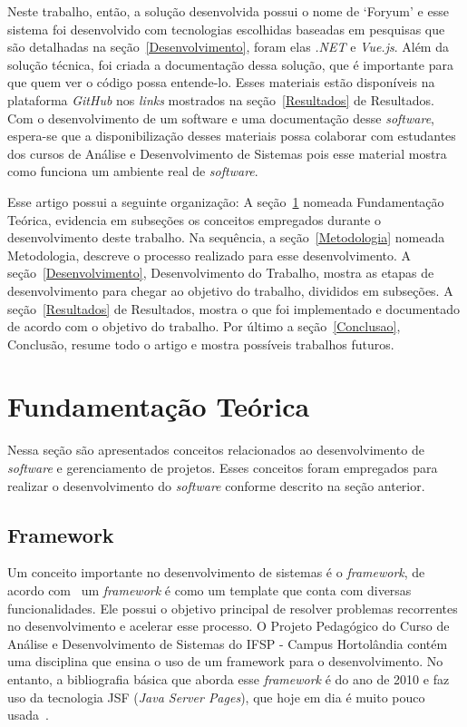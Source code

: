 \documentclass[12pt]{article}
\begin{document}
Neste trabalho, então, a solução desenvolvida possui o nome de `Foryum' e esse sistema foi desenvolvido
com tecnologias escolhidas baseadas em pesquisas que são detalhadas na seção~\ref{Desenvolvimento},
foram elas \textit{.NET} e \textit{Vue.js}. Além da solução técnica, foi criada a documentação dessa solução, que é
importante para que quem ver o código possa entende-lo. Esses materiais estão disponíveis na plataforma \textit{GitHub} nos
\textit{links} mostrados na seção~\ref{Resultados} de Resultados. Com o desenvolvimento de um software
e uma documentação desse \textit{software}, espera-se que a disponibilização desses materiais
possa colaborar com estudantes dos cursos de Análise e Desenvolvimento de Sistemas pois esse material mostra como funciona um ambiente
real de \textit{software}.

Esse artigo possui a seguinte organização: A seção~\ref{FundamentacaoTeorica} nomeada Fundamentação Teórica,
evidencia em subseções os conceitos empregados durante o desenvolvimento deste trabalho. Na sequência,
a seção~\ref{Metodologia} nomeada Metodologia, descreve o processo realizado para esse desenvolvimento.
A seção~\ref{Desenvolvimento}, Desenvolvimento do Trabalho, mostra as etapas de desenvolvimento para chegar ao objetivo do trabalho, divididos em subseções.
A seção~\ref{Resultados} de Resultados, mostra o que foi implementado e documentado de acordo com o objetivo do trabalho.
Por último a seção~\ref{Conclusao}, Conclusão, resume todo o artigo e mostra possíveis trabalhos futuros.

\section{Fundamentação Teórica}\label{FundamentacaoTeorica}

Nessa seção são apresentados conceitos relacionados ao desenvolvimento de \textit{software} e gerenciamento
de projetos. Esses conceitos foram empregados para realizar o desenvolvimento do \textit{software} conforme descrito na seção anterior.

\subsection{Framework}

Um conceito importante no desenvolvimento de sistemas é o \textit{framework}, de acordo com~\cite{host12} um
\textit{framework} é como um template que conta com diversas funcionalidades. Ele possui o objetivo principal de
resolver problemas recorrentes no desenvolvimento e acelerar esse processo. O
Projeto Pedagógico do Curso de Análise e Desenvolvimento de Sistemas do IFSP - Campus Hortolândia
contém uma disciplina que ensina o uso de um framework para o desenvolvimento. No entanto, a bibliografia básica
que aborda esse \textit{framework} é do ano de 2010 e faz uso da tecnologia JSF (\textit{Java Server Pages}), que hoje em dia é muito pouco usada~\cite{webtechsurveyJSF}.
\end{document}
